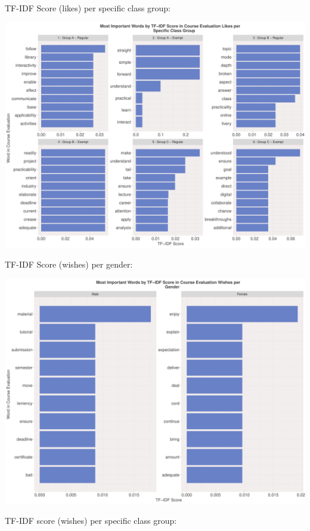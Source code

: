 \documentclass[
]{article}
\begin{document}
\newpage

TF-IDF Score (likes) per specific class group:

\includegraphics{AnalysisOfCourseEvaluation-Notebook_files/figure-latex/TF-IDFLikesPerGroup-1.pdf}

\newpage

TF-IDF Score (wishes) per gender:

\includegraphics{AnalysisOfCourseEvaluation-Notebook_files/figure-latex/TF-IDFWishesPerGender-1.pdf}

\newpage

TF-IDF score (wishes) per specific class group:
\end{document}
